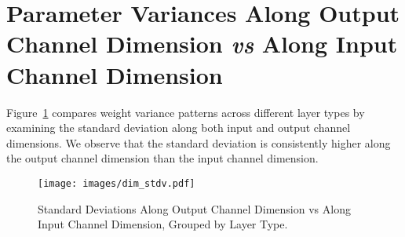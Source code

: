 \section{Parameter Variances Along Output Channel Dimension \textit{vs} Along Input Channel Dimension \label{app:channel_var}}
Figure~\ref{fig:channel_var} compares weight variance patterns across different layer types by examining the standard deviation along both input and output channel dimensions. We observe that the standard deviation is consistently higher along the output channel dimension than the input channel dimension.
\begin{figure}[ht]
\vskip 0.2in
\begin{center}
\centerline{\texttt{[image: images/dim\_stdv.pdf]}}
\caption{Standard Deviations Along Output Channel Dimension vs Along Input Channel Dimension, Grouped by Layer Type.}
\label{fig:channel_var}
\end{center}
\vskip -0.2in
\end{figure}
